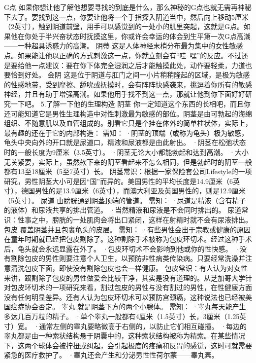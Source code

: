 \documentclass[12pt,UTF8]{ctexbook}
\begin{document}
G点
如果你想让他了解他想要寻找的到底是什么，那么神秘的G点也就无需再神秘下去了。要找到这一点，你要让他将一个手指探入阴道当中，然后向上移动5厘米（2英寸），触到阴道前壁，用手可以感觉到的一处小的肌里突起，这就是G点。如果他在你处于半兴奋状态时抚摸这里，你或许会幸运的体会到生平第一次G点高潮——一种超具诱惑力的高潮。
阴蒂
这是人体神经末梢分布最为集中的女性敏感点。如果能让他以正确的方式刺激这一点，你就立刻会有“哇~嘿”的反应。不过还是要给他一点建议：要在你下体完全湿润之后才能触摸此处，动作要轻柔，力道也要恰到好处。
会阴
这是位于阴道与肛门之间一小片稍稍隆起的区域，是极为敏感的性感地带，受到摩擦、舔吮或抚摸时，会有阵阵快感袭来，挑逗着你所有的敏感神经，并且有助于增强高潮。如果他用手找不到这一点，那就让他到你下面好好研究一下吧。
5.了解一下他的生理构造
阴茎
你一定知道这个东西的长相吧，而且你还可能知道它是男性生理构造中对性刺激最为敏感的部位。阴茎是由可勃起的海绵组织、不随意肌以及血管组成的。别看它只是个挂在体外的简单柱状体，实际上，最有趣的还在于它的内部构造：
需知：
·阴茎的顶端（或称为龟头）极为敏感，龟头中央向外的开口就是尿道口，精液和尿液都是由此射出。
·阴茎在松弛状态时的一般长度为9厘米（3.5英寸）。
·阴茎无论大小都能勃起和达到高潮。
·大小无关紧要，实际上，虽然软下来的阴茎看起来不怎么相同，但是勃起时的阴茎一般都有13至18厘米（5至7英寸）长。
阴茎常识：根据一家保险套公司Lifestyle的一项研究，男性阴茎大小可是因“国”而异的。美国男性的平均长度是14.9厘米（6英寸），德国男性的是13.9厘米（6英寸），而澳大利亚及英国男性的，则是12.9厘米（5英寸）。
尿道
由膀胱通到阴茎顶端的管道。
需知：
·尿道是精液（含有精子的液体）和尿液共享的排出管道。
·当然精液和尿液是不会同时排出的。
尿道常识：性事之中，膀胱的一处肌肉会将出口紧闭，这样在射精时就不会有尿液排出。
包皮
覆盖阴茎并且包裹龟头的皮层。
需知：
·有些男性会出于宗教或健康的原因在童年时期就已经把包皮割除了。这种割除手术被称为包皮环切术。经过这种手术后，龟头就会永远显露在外了。
·包皮环切术不会影响到他或你的性快感。
·没有割除包皮的男性则要注意个人卫生，以预防非性病类传染病。只要经常洗澡并注意清洗包皮下面，即使没有割除包皮也会一样健康。
包皮常识：有人认为对女性来讲，跟割除了包皮的男性做爱会比较干净，其实是没有道理的。从芝加哥大学针对包皮环切术的一项研究来看，割过包皮的男性与没有割过的男性，在性健康方面没有任何明显差异。还有人认为包皮环切术可以预防宫颈癌，这种说法也已经被美国癌症协会否定。
睾丸
就是阴茎下方的两个小腺体。
需知：
·睾丸每天能产生多达几百万粒的精子。
·单个睾丸一般都有4厘米（1.5英寸）长，3厘米（1.25英寸）宽。
·通常左侧的睾丸要略微高于右侧的，以防止它们相互碰撞。
·每边的睾丸都是由一种索状结构悬于阴囊中的，这种索状结构被称为精索。在某些情况下，这两个球体会被拧扭或纠起，会引起极度的疼痛和反胃的感觉，这时可就需要紧急的医疗救护了。
·睾丸还会产生和分泌男性性荷尔蒙——睾丸素。
\end{document}
